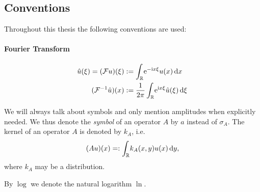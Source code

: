 \subsection{Conventions}
Throughout this thesis the following conventions are used:
\paragraph{Fourier Transform}
\begin{align*}
  \hat{u}(\xi) = (\mathcal{F}u)(\xi)
    &:= \Integ{\mathbb{R}}{x}{\Eto{-\mathrm ix\xi} u(x)} \\
  (\mathcal{F}^{-1}\hat{u})(x) &:=
  \frac{1}{2\pi}\Integ{\mathbb{R}}{\xi}{\Eto{\mathrm ix\xi}
    \hat{u}(\xi)}
\end{align*}

We will always talk about symbols and only mention amplitudes when explicitly
needed. We thus denote the \emph{symbol} of an operator $A$ by $a$ instead of
$\sigma_A$. The kernel of an operator $A$ is denoted by $k_A$, i.e.\ 
\begin{align*}
  (Au)(x) =: \Integ{\mathbb{R}}{y}{k_A(x,y) u(x)},
\end{align*}
where $k_A$ may be a distribution.

By $\log$ we denote the natural logarithm $\ln$.
